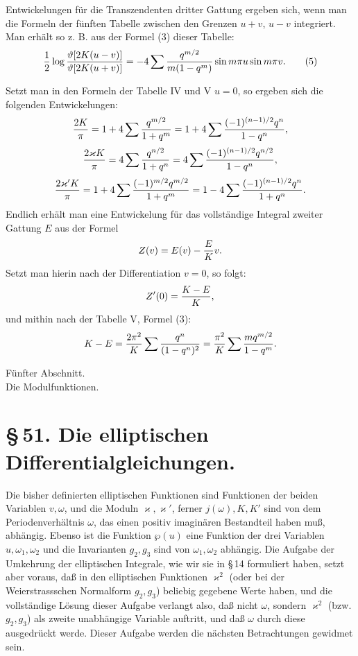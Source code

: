 \documentclass[11pt]{article}
\begin{document}
Entwickelungen für die Transzendenten dritter Gattung ergeben sich, wenn man die Formeln der fünften Tabelle zwischen den Grenzen $u+v$, $u-v$ integriert. Man erhält so z. B. aus der Formel (3) dieser Tabelle:
\begin{equation}
{1\over2}\log{\vartheta[2K(u-v)]\over\vartheta[2K(u+v)]}
=-4\sum {q^{m/2}\over m(1-q^m)}\sin m\pi u\sin m\pi v.
\tag{5}
\end{equation}

Setzt man in den Formeln der Tabelle IV und V $u=0$, so ergeben sich die folgenden Entwickelungen:
\[
{2K\over\pi}=1+4\sum{q^{m/2}\over1+q^m}
=1+4\sum{(-1)^{(n-1)/2}q^n\over1-q^n},
\]
\[
{2\varkappa K\over\pi}=4\sum{q^{n/2}\over1+q^n}
=4\sum{(-1)^{(n-1)/2}q^{n/2}\over1-q^n},
\]
\[
{2\varkappa' K\over\pi}=1+4\sum{(-1)^{m/2}q^{m/2}\over1+q^m}
=1-4\sum{(-1)^{(n-1)/2}q^n\over1+q^n}.
\]
Endlich erhält man eine Entwickelung für das vollständige Integral zweiter Gattung $E$ aus der Formel
\[
Z(v)=E(v)-{E\over K}v.
\]
Setzt man hierin nach der Differentiation $v=0$, so folgt:
\[
Z'(0)={K-E\over K},
\]
und mithin nach der Tabelle V, Formel (3):
\[
K-E={2\pi^2\over K}\sum {q^n\over(1-q^n)^2}
={\pi^2\over K}\sum {m q^{m/2}\over1-q^m}.
\]

\begin{center}
{\large Fünfter Abschnitt.}\\[0.7em]
{\Large Die Modulfunktionen.}
\end{center}

\section*{\S\,51. Die elliptischen Differentialgleichungen.}

Die bisher definierten elliptischen Funktionen sind Funktionen der beiden Variablen $v,\omega$, und die Moduln $\varkappa,\varkappa'$, ferner $j(\omega),K,K'$ sind von dem Periodenverhältnis $\omega$, das einen positiv imaginären Bestandteil haben muß, abhängig. Ebenso ist die Funktion $\wp(u)$ eine Funktion der drei Variablen $u,\omega_1,\omega_2$ und die Invarianten $g_2,g_3$ sind von $\omega_1,\omega_2$ abhängig. Die Aufgabe der Umkehrung der elliptischen Integrale, wie wir sie in \S\,14 formuliert haben, setzt aber voraus, daß in den elliptischen Funktionen $\varkappa^2$ (oder bei der Weierstrassschen Normalform $g_2,g_3$) beliebig gegebene Werte haben, und die vollständige Lösung dieser Aufgabe verlangt also, daß nicht $\omega$, sondern $\varkappa^2$ (bzw. $g_2,g_3$) als zweite unabhängige Variable auftritt, und daß $\omega$ durch diese ausgedrückt werde. Dieser Aufgabe werden die nächsten Betrachtungen gewidmet sein.
\end{document}
